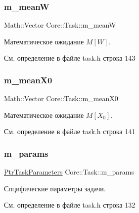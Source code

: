 \hypertarget{class_core_1_1_task_a3391c29d286ebfae9e77cce5723f2e8c}{}\label{class_core_1_1_task_a3391c29d286ebfae9e77cce5723f2e8c} 
\subsubsection{\texorpdfstring{m\+\_\+meanW}{m\_meanW}}
{\footnotesize\ttfamily Math\+::\+Vector Core\+::\+Task\+::m\+\_\+meanW\hspace{0.3cm}{\ttfamily [protected]}}

Математическое ожидание $M[W]$. 

См. определение в файле task.\+h строка 143

\hypertarget{class_core_1_1_task_a4482edff14b2fca2313e164614bb9693}{}\label{class_core_1_1_task_a4482edff14b2fca2313e164614bb9693} 
\subsubsection{\texorpdfstring{m\+\_\+mean\+X0}{m\_meanX0}}
{\footnotesize\ttfamily Math\+::\+Vector Core\+::\+Task\+::m\+\_\+mean\+X0\hspace{0.3cm}{\ttfamily [protected]}}

Математическое ожидание $M[X_0]$. 

См. определение в файле task.\+h строка 141

\hypertarget{class_core_1_1_task_a99bf439867f7a4f38cde5eb142f4414a}{}\label{class_core_1_1_task_a99bf439867f7a4f38cde5eb142f4414a} 
\subsubsection{\texorpdfstring{m\+\_\+params}{m\_params}}
{\footnotesize\ttfamily \hyperlink{namespace_core_a3e0e555656bf795146ebb0882e28da2f}{Ptr\+Task\+Parameters} Core\+::\+Task\+::m\+\_\+params\hspace{0.3cm}{\ttfamily [protected]}}

Спцифические параметры задачи. 

См. определение в файле task.\+h строка 132

\hypertarget{class_core_1_1_task_af73402499755e2c2931b9d30456fd06a}{}\label{class_core_1_1_task_af73402499755e2c2931b9d30456fd06a} 
